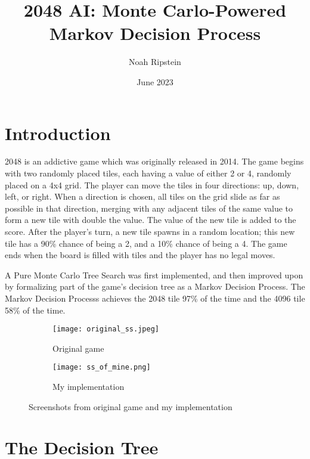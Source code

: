 \documentclass{article}
\title{2048 AI: Monte Carlo-Powered Markov Decision Process}
\author{Noah Ripstein}
\date{June 2023}
\begin{document}
\maketitle

\section{Introduction}

2048 is an addictive game which was originally released in 2014.  The game begins with two randomly placed tiles, each having a value of either 2 or 4, randomly placed on a 4x4 grid. The player can move the tiles in four directions: up, down, left, or right. When a direction is chosen, all tiles on the grid slide as far as possible in that direction, merging with any adjacent tiles of the same value to form a new tile with double the value.  The value of the new tile is added to the score. After the player's turn,  a new tile spawns in a random location; this new tile has a 90\% chance of being a 2, and a 10\% chance of being a 4.   The game ends when the board is filled with tiles and the player has no legal moves.

A Pure Monte Carlo Tree Search was first implemented, and then improved upon by formalizing part of the game's decision tree as a Markov Decision Process.  The Markov Decision Processs achieves the 2048 tile 97\% of the time and the 4096 tile 58\% of the time. 



\begin{figure}[htbp]
  \centering
  \begin{subfigure}[b]{0.45\textwidth}
    \texttt{[image: original\_ss.jpeg]}
    \caption{Original game}
    \label{fig:original_ss}
  \end{subfigure}
  \hfill
  \begin{subfigure}[b]{0.45\textwidth}
    \texttt{[image: ss\_of\_mine.png]}
    \caption{My implementation}
    \label{fig:ss_of_mine}
  \end{subfigure}
  \caption{Screenshots from original game and my implementation}
  \label{fig:screenshots}
\end{figure}

\section{The Decision Tree}
\end{document}
